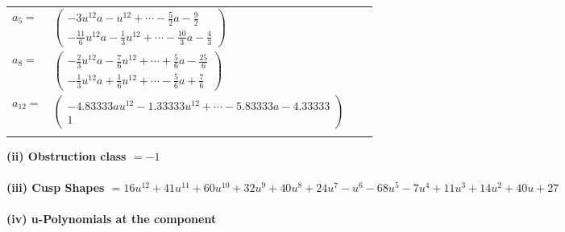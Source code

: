\documentclass[1p]{elsarticle_modified}
\theoremstyle{definition}
\begin{document}
\begin{tabular}{m{7pt} m{180pt} m{7pt} m{180pt} }
\flushright $a_{5}=$&$\begin{pmatrix}-3 u^{12} a- u^{12}+\cdots-\frac{5}{2} a-\frac{9}{2}\\-\frac{11}{6} u^{12} a-\frac{1}{3} u^{12}+\cdots-\frac{10}{3} a-\frac{4}{3}\end{pmatrix}$ \\
\flushright $a_{8}=$&$\begin{pmatrix}-\frac{2}{3} u^{12} a-\frac{7}{6} u^{12}+\cdots+\frac{5}{6} a-\frac{25}{6}\\-\frac{1}{3} u^{12} a+\frac{1}{6} u^{12}+\cdots-\frac{5}{6} a+\frac{7}{6}\end{pmatrix}$ \\
\flushright $a_{12}=$&$\begin{pmatrix}-4.83333 a u^{12}-1.33333 u^{12}+\cdots-5.83333 a-4.33333\\1\end{pmatrix}$\\&\end{tabular}
\flushleft \textbf{(ii) Obstruction class $= -1$}\\~\\
\flushleft \textbf{(iii) Cusp Shapes $= 16 u^{12}+41 u^{11}+60 u^{10}+32 u^9+40 u^8+24 u^7- u^6-68 u^5-7 u^4+11 u^3+14 u^2+40 u+27$}\\~\\
\newpage\renewcommand{\arraystretch}{1}
\flushleft \textbf{(iv) u-Polynomials at the component}\newline \\
\end{document}
